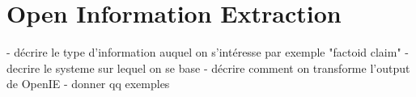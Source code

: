 \section{Open Information Extraction}
-  décrire le type d'information auquel on s'intéresse par exemple "factoid claim"
- decrire le systeme sur lequel on se base
- décrire comment on transforme l'output de OpenIE
- donner qq exemples
